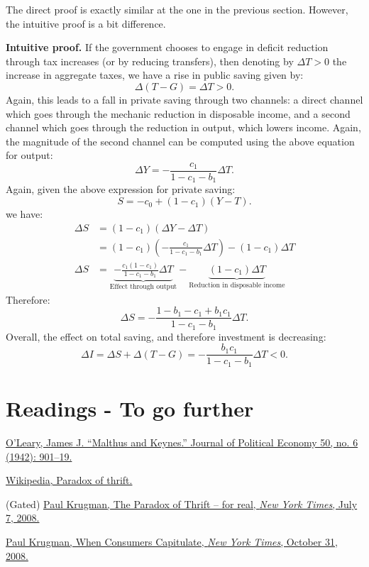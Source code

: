 \documentclass[]{book}
\theoremstyle{definition}
\theoremstyle{definition}
\theoremstyle{definition}
\theoremstyle{remark}
\begin{document}
The direct proof is exactly similar at the one in the previous section.
However, the intuitive proof is a bit difference.

\textbf{Intuitive proof.} If the government chooses to engage in deficit
reduction through tax increases (or by reducing transfers), then
denoting by \(\Delta T>0\) the increase in aggregate taxes, we have a
rise in public saving given by: \[\Delta(T-G)=\Delta T>0.\] Again, this
leads to a fall in private saving through two channels: a direct channel
which goes through the mechanic reduction in disposable income, and a
second channel which goes through the reduction in output, which lowers
income. Again, the magnitude of the second channel can be computed using
the above equation for output:
\[\Delta Y=-\frac{c_{1}}{1-c_{1}-b_{1}}\Delta T.\] Again, given the
above expression for private saving:
\[S=-c_{0}+\left(1-c_{1}\right)\left(Y-T\right).\] we have: \[
\begin{aligned}
\Delta S    &=(1-c_{1})(\Delta Y-\Delta T)\\
    &=(1-c_{1})\left(-\frac{c_{1}}{1-c_{1}-b_{1}}\Delta T\right)-(1-c_{1})\Delta T\\
\Delta S    &=\underbrace{-\frac{c_{1}(1-c_{1})}{1-c_{1}-b_{1}}\Delta T}_{\text{Effect through output}}-\underbrace{(1-c_{1})\Delta T}_{\text{Reduction in disposable income}}
\end{aligned}
\] Therefore:
\[\Delta S=-\frac{1-b_{1}-c_{1}+b_{1}c_{1}}{1-c_{1}-b_{1}}\Delta T.\]
Overall, the effect on total saving, and therefore investment is
decreasing:
\[\Delta I  =\Delta S+\Delta(T-G)=-\frac{b_{1}c_{1}}{1-c_{1}-b_{1}}\Delta T<0.\]

\section*{Readings - To go further}\label{readings---to-go-further-7}

\href{https://www.jstor.org/stable/1826621}{O'Leary, James J. ``Malthus
and Keynes.'' Journal of Political Economy 50, no. 6 (1942): 901--19.}

\href{https://en.wikipedia.org/wiki/Paradox_of_thrift}{Wikipedia,
Paradox of thrift.}

(Gated)
\href{https://krugman.blogs.nytimes.com/2009/07/07/the-paradox-of-thrift-for-real/}{Paul
Krugman, The Paradox of Thrift -- for real, \emph{New York Times}, July
7, 2008.}

\href{https://search.proquest.com/nytimes/docview/433945040/E76AA2F8F9C14A34PQ/2?accountid=14512}{Paul
Krugman, When Consumers Capitulate, \emph{New York Times}, October 31,
2008.}
\end{document}
